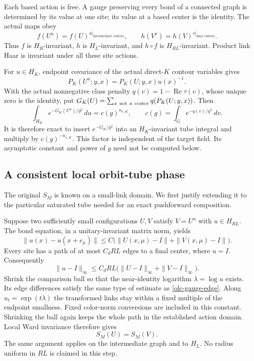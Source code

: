 \documentclass[11pt]{article}
\theoremstyle{remark}
\begin{document}
Each based action is free. A gauge preserving every bond of a
connected graph is determined by its value at one site; its
value at a based center is the identity.
The actual maps obey
\begin{equation}
 f(U^u)=f(U)^{u|_{\text{intermediate centers}}},\qquad
 h(V^v)=h(V)^{v|_{\text{final centers}}}.
 \label{olc-equivariance}
\end{equation}
Thus $f$ is $H_R$-invariant, $h$ is $H_L$-invariant, and
$h\circ f$ is $H_{RL}$-invariant. Product link Haar is
invariant under all these site actions.

For $u\in H_K$, endpoint covariance of the actual direct-$K$
contour variables gives
\[
 P_K(U^u;y,x)=P_K(U;y,x)u(x)^{-1}.
\]
With the actual nonnegative class penalty
$q(v)=1-\operatorname{Re}\tau(v)$, whose unique zero is the
identity, put $G_K(U)=\sum_{x\ {\rm not\ a\ center}}q(P_K(U;y,x))$.
Then
\begin{equation}
 \int_{H_K}e^{-G_K(U^u)/g^2}\,du
       =c(g)^{n_{s,K}},\qquad
 c(g)=\int_G e^{-q(v)/g^2}\,dv .
 \label{olc-gauge-insertion}
\end{equation}
It is therefore exact to insert $e^{-G_K/g^2}$ into an
$H_K$-invariant tube integral and multiply by
$c(g)^{-n_{s,K}}$. This factor is independent of the target
field. Its asymptotic constant and power of $g$ need not be
computed below.

\subsection{A consistent local orbit-tube phase}
\label{olc-tube-section}

The original $S_M$ is known on a small-link domain. We first
justify extending it to the particular saturated tube needed
for an exact pushforward composition.

Suppose two sufficiently small configurations $U,V$ satisfy
$V=U^u$ with $u\in H_{RL}$. The bond equation, in a
unitary-invariant matrix norm, yields
\begin{equation}
 \|u(x)-u(x+e_\mu)\|
   \leq C\bigl(\|U(x,\mu)-I\|+\|V(x,\mu)-I\|\bigr).
 \label{olc-gauge-edge}
\end{equation}
Every site has a path of at most $C_dRL$ edges to a final
center, where $u=I$. Consequently
\begin{equation}
 \|u-I\|_\infty
   \leq C_dRL\bigl(\|U-I\|_\infty+\|V-I\|_\infty\bigr).
 \label{olc-gauge-small}
\end{equation}
Shrink the comparison ball so that the near-identity logarithm
$\lambda=\log u$ exists. Its edge differences satisfy the
same type of estimate as \eqref{olc-gauge-edge}.
Along $u_t=\exp(t\lambda)$ the transformed links stay within
a fixed multiple of the endpoint smallness. Fixed color-norm
conversions are included in this constant. Shrinking the ball
again keeps the whole path in the established action domain.
Local Ward invariance therefore gives
\begin{equation}
                         S_M(U)=S_M(V).
 \label{olc-phase-consistency}
\end{equation}
The same argument applies on the intermediate graph and to
$H_L$. No radius uniform in $RL$ is claimed in this step.
\end{document}
